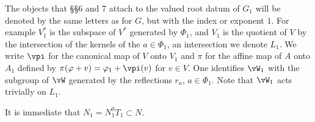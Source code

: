 \documentclass[12pt,a4paper,oneside,english]{smfart}
\theoremstyle{definition}
\theoremstyle{bt}
\begin{document}
\smallskip
The objects that \S\S6 and 7 attach to the valued root datum of $G_1$ will be
denoted by the same letters as for $G$, but with the index or exponent $1$. For
example $V_1^{*}$ is the subspace of $V^{*}$ generated by $\Phi_1$, and $V_1$ is the
quotient of $V$ by the intersection of the kernels of the $a\in\Phi_1$, an
intersection we denote $L_1$. We write $\vpi$ for the canonical map of $V$ onto
$V_1$ and $\pi$ for the affine map of $A$ onto $A_1$ defined by
$\pi(\varphi+v)=\varphi_1+\vpi(v)$ for $v\in V$. One identifies $\vW_1$ with the
subgroup of $\vW$ generated by the reflections $r_a$, $a\in\Phi_1$. Note that
$\vW_1$ acts trivially on $L_1$.

It is immediate that $N_1=N_1^{0}T_1\subset N$.
\par\endgroup

\begingroup\providecommand{\headrulewidth}{}
\renewcommand{\headrulewidth}{0pt}
\providecommand{\bui}{}
\renewcommand{\bui}{\mathscr{I}}
\providecommand{\nat}{}
\renewcommand{\nat}{\natural}
\providecommand{\red}{}
\renewcommand{\red}{\mathrm{red}}
\providecommand{\Isom}{}
\renewcommand{\Isom}{\operatorname{Isom}}
\providecommand{\Card}{}
\renewcommand{\Card}{\operatorname{Card}}
\providecommand{\Ker}{}
\renewcommand{\Ker}{\operatorname{Ker}}
\providecommand{\Hom}{}
\renewcommand{\Hom}{\operatorname{Hom}}
\providecommand{\Mult}{}
\renewcommand{\Mult}{\mathrm{Mult}}
\providecommand{\R}{}
\renewcommand{\R}{\mathbf{R}}
\providecommand{\Z}{}
\renewcommand{\Z}{\mathbf{Z}}
\providecommand{\N}{}
\renewcommand{\N}{\mathbf{N}}
\providecommand{\Rp}{}
\renewcommand{\Rp}{\R^{*}_{+}}
\providecommand{\Bor}{}
\renewcommand{\Bor}{\mathscr{B}}
\providecommand{\Nor}{}
\renewcommand{\Nor}{\mathscr{N}}
\providecommand{\Gor}{}
\renewcommand{\Gor}{\mathscr{G}}
\providecommand{\Hor}{}
\renewcommand{\Hor}{\mathscr{H}}
\providecommand{\Uor}{}
\renewcommand{\Uor}{\mathscr{U}}
\providecommand{\Eor}{}
\renewcommand{\Eor}{\mathscr{E}}
\providecommand{\Xor}{}
\renewcommand{\Xor}{\mathscr{X}}
\providecommand{\Yor}{}
\renewcommand{\Yor}{\mathscr{Y}}
\providecommand{\Rel}{}
\renewcommand{\Rel}{\mathscr{R}}
\providecommand{\Pw}{}
\renewcommand{\Pw}{\mathfrak{P}}
\providecommand{\Gr}{}
\renewcommand{\Gr}{\mathscr{G}}
\providecommand{\Tr}{}
\renewcommand{\Tr}{\mathscr{T}}
\providecommand{\vv}{}
\renewcommand{\vv}[1]{{}^{v}\!#1}
\providecommand{\wt}{}
\renewcommand{\wt}{\widetilde}
\providecommand{\ph}{}
\renewcommand{\ph}{\varphi}
\providecommand{\ps}{}
\renewcommand{\ps}{\psi}
\providecommand{\Ph}{}
\end{document}
